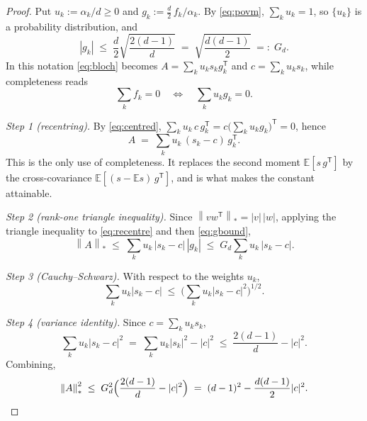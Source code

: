 \documentclass[10pt,a4paper]{amsart}
\newcommand{\nuc}[1]{\left\lVert #1 \right\rVert_{*}}
\theoremstyle{plain}
\theoremstyle{remark}
\begin{document}
\begin{proof}
Put $u_k := \alpha_k/d \ge 0$ and $g_k := \tfrac{d}{2}\,f_k/\alpha_k$. By \eqref{eq:povm}, $\sum_k u_k=1$, so $\{u_k\}$ is a probability distribution, and
\begin{equation}\label{eq:gbound}
|g_k| \;\le\; \frac{d}{2}\sqrt{\frac{2(d-1)}{d}} \;=\; \sqrt{\frac{d(d-1)}{2}} \;=:\; G_d .
\end{equation}
In this notation \eqref{eq:bloch} becomes $A=\sum_k u_k s_k g_k^{\mathsf T}$ and $c=\sum_k u_k s_k$, while completeness reads
\begin{equation}\label{eq:centred}
\sum_k f_k=0 \quad\Longleftrightarrow\quad \sum_k u_k g_k = 0 .
\end{equation}

\emph{Step 1 (recentring).} By \eqref{eq:centred}, $\sum_k u_k\,c\,g_k^{\mathsf T} = c\big(\sum_k u_k g_k\big)^{\mathsf T} = 0$, hence
\begin{equation}\label{eq:recentre}
A \;=\; \sum_k u_k\,(s_k-c)\,g_k^{\mathsf T}.
\end{equation}
This is the only use of completeness. It replaces the second moment $\mathbb{E}[s\,g^{\mathsf T}]$ by the cross-covariance $\mathbb{E}[(s-\mathbb{E}s)\,g^{\mathsf T}]$, and is what makes the constant attainable.

\emph{Step 2 (rank-one triangle inequality).} Since $\nuc{vw^{\mathsf T}}=|v|\,|w|$, applying the triangle inequality to \eqref{eq:recentre} and then \eqref{eq:gbound},
\[
\nuc{A} \;\le\; \sum_k u_k\,|s_k-c|\,|g_k| \;\le\; G_d\sum_k u_k\,|s_k-c| .
\]

\emph{Step 3 (Cauchy--Schwarz).} With respect to the weights $u_k$,
\[
\sum_k u_k|s_k-c| \;\le\; \Big(\sum_k u_k|s_k-c|^2\Big)^{1/2}.
\]

\emph{Step 4 (variance identity).} Since $c=\sum_k u_k s_k$,
\[
\sum_k u_k|s_k-c|^2 \;=\; \sum_k u_k|s_k|^2 - |c|^2 \;\le\; \frac{2(d-1)}{d}-|c|^2 .
\]
Combining,
\[
\nuc{A}^2 \;\le\; G_d^2\Big(\frac{2(d-1)}{d}-|c|^2\Big) \;=\; (d-1)^2-\frac{d(d-1)}{2}|c|^2 . \qedhere
\]
\end{proof}
\end{document}
